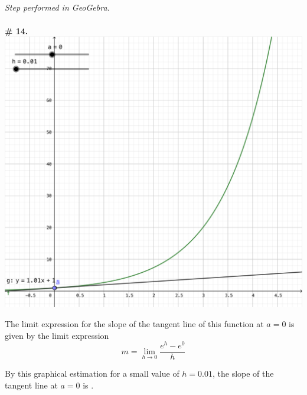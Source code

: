 \documentclass{article}
\begin{document}
\subsection{}
\emph{Step performed in GeoGebra.}
\\
\\
\textbf{\# 14.} \\
\includegraphics[width=\textwidth]{cl4-14}

The limit expression for the slope of the tangent line of this function at $a=0$ is given by the limit expression
$$
m = \lim_{h \rightarrow 0} \frac{e^{h} - e^0}{h}
$$

By this graphical estimation for a small value of $h=0.01$, the slope of the tangent line at $a=0$ is .
\end{document}

